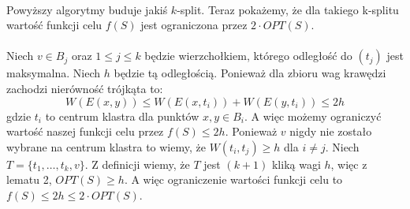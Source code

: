 \\
Powyższy algorytmy buduje jakiś $k$-split.
Teraz pokażemy, że dla takiego k-splitu wartość funkcji celu $f(S)$ jest ograniczona przez $2 \cdot OPT(S)$.
\\~\\
Niech $v \in B_{j}$ oraz $1 \leq j \leq k$ będzie wierzchołkiem, którego odległość do $(t_{j})$ jest maksymalna.
Niech $h$ będzie tą odległością.
Ponieważ dla zbioru wag krawędzi zachodzi nierówność trójkąta to:
\begin{equation}
    W(E(x, y)) \leq W(E(x, t_{i})) + W(E(y, t_{i})) \leq 2h
\end{equation}
gdzie $t_{i}$ to centrum klastra dla punktów $x, y \in B_{i}$.
A więc możemy ograniczyć wartość naszej funkcji celu przez $f(S) \leq 2h$.
Ponieważ $v$ nigdy nie zostało wybrane na centrum klastra to wiemy, że $W(t_{i}, t_{j}) \geq h$ dla $i \neq j$.
Niech $T = \{ t_{1}, \dots, t_{k}, v \}$.
Z definicji wiemy, że $T$ jest $(k+1)$ kliką wagi $h$, więc z lematu 2, $OPT(S) \geq h$.
A więc ograniczenie wartości funkcji celu to $ f(S) \leq 2h \leq 2 \cdot OPT(S)$.